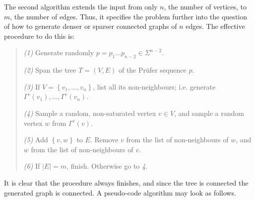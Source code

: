 \documentclass[a4paper, 12pt]{article}
\begin{document}
The second algorithm extends the input from only $n$, the number of 
vertices, to $m$, the number of edges. Thus, it specifies the problem 
further into the question of how to generate denser or sparser connected graphs
of $n$ edges. The effective procedure to do this is:

\begin{quote}
    \textit{(1)} Generate randomly $p = p_1\ldots p_{n-2} \in \Sigma^{n-2}$.

    \textit{(2)} Span the tree $T = (V, E)$ of the Prüfer sequence $p$.

    \textit{(3)} If $V = \left\{ v_1, \ldots, v_n \right\} $, list all its non-neighbours; i.e. generate $\Gamma^c(v_1), \ldots, \Gamma^c(v_n)$.

    \textit{(4)} Sample a random, non-saturated vertex $v \in V$, and sample a random vertex $w$
    from $\Gamma^c(v)$.

    \textit{(5)} Add $\left\{ v, w \right\} $ to $E$. Remove $v$ from the list of non-neighbours of 
    $w$, and $w$ from the list of non-neighbours of $v$. 

    \textit{(6)} If $|E| = m$, finish. Otherwise go to \textit{4}.
\end{quote}

It is clear that the procedure always finishes, and since the tree is connected
the generated graph is connected. A pseudo-code algorithm may look as follows.
\end{document}
